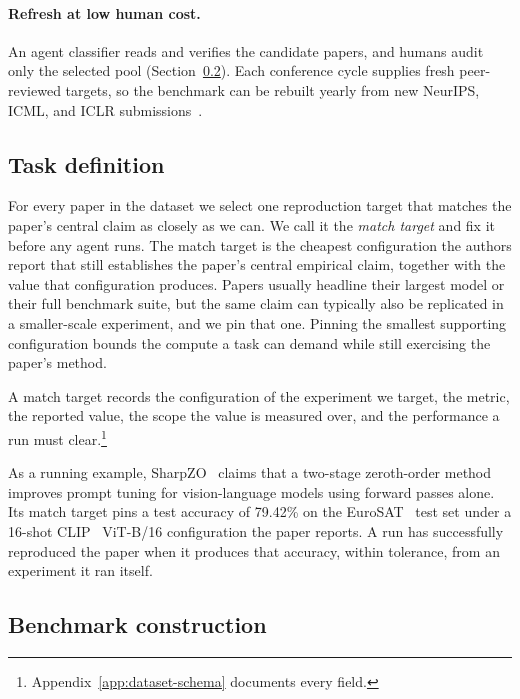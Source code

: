 \documentclass{article} %
\begin{document}
\paragraph{Refresh at low human cost.} An agent classifier reads and
verifies the candidate papers, and humans audit only the selected pool
(Section~\ref{subsec:construction}). Each conference cycle supplies fresh
peer-reviewed targets, so the benchmark can be rebuilt yearly from new
NeurIPS, ICML, and ICLR submissions~\citep[cf.][]{white2025livebench,jain2025livecodebench,badertdinov2025swerebench}.

\subsection{Task definition}
\label{subsec:task}

For every paper in the dataset we select one reproduction target that matches
the paper's central claim as closely as we can. We call it the \emph{match
target} and fix it before any agent runs. The match target is the cheapest
configuration the authors report that still establishes the paper's central
empirical claim, together with the value that configuration produces. Papers
usually headline their largest model or their full benchmark suite, but the
same claim can typically also be replicated in a smaller-scale experiment, and we
pin that one. Pinning the smallest supporting configuration bounds the compute a task
can demand while still exercising the paper's method.

A match target records the configuration of the experiment we target, the
metric, the reported value, the scope the value is measured over, and the
performance a run must clear.\footnote{Appendix~\ref{app:dataset-schema}
documents every field.}

As a running example, SharpZO~\citep{yang2025sharpzo} claims that a two-stage
zeroth-order method improves prompt tuning for vision-language models using
forward passes alone. Its match target pins a test accuracy of 79.42\% on the
EuroSAT~\citep{helber2019eurosat} test set under a 16-shot CLIP~\citep{radford2021clip} ViT-B/16 configuration the paper
reports. A run has successfully reproduced the paper when it produces that
accuracy, within tolerance, from an experiment it ran itself.

\subsection{Benchmark construction}
\label{subsec:construction}
\end{document}
